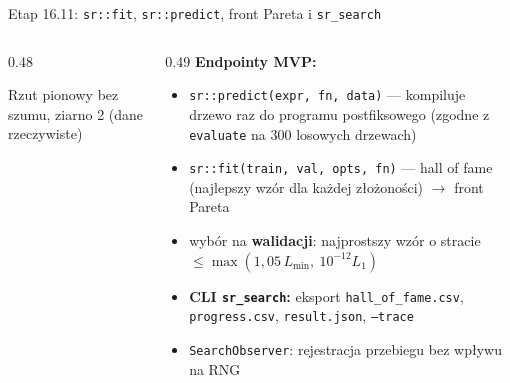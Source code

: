 \documentclass[
  polish,
  aspectratio=169,
]{beamer}
\begin{document}
\begin{frame}{Etap 16.11: \texttt{sr::fit}, \texttt{sr::predict}, front Pareta i \texttt{sr\_search}}
  \begin{columns}[c]
    \begin{column}{0.48\textwidth}
      \par
      {\scriptsize\color{aghmuted}Rzut pionowy bez szumu, ziarno 2 (dane rzeczywiste)}
    \end{column}
    \begin{column}{0.49\textwidth}
      \textbf{Endpointy MVP:}
      \begin{itemize}\footnotesize
        \item \texttt{sr::predict(expr, fn, data)} --- kompiluje drzewo raz do programu postfiksowego (zgodne z \texttt{evaluate} na 300 losowych drzewach)
        \item \texttt{sr::fit(train, val, opts, fn)} --- hall of fame (najlepszy wzór dla każdej złożoności) $\to$ front Pareta
        \item wybór na \textbf{walidacji}: najprostszy wzór o stracie $\le \max(1{,}05\,L_{\min},\ 10^{-12} L_1)$
        \item \textbf{CLI \texttt{sr\_search}:} eksport \texttt{hall\_of\_fame.csv}, \texttt{progress.csv}, \texttt{result.json}, \texttt{--trace}
        \item \texttt{SearchObserver}: rejestracja przebiegu bez wpływu na RNG
      \end{itemize}
    \end{column}
  \end{columns}
\end{frame}
\end{document}
